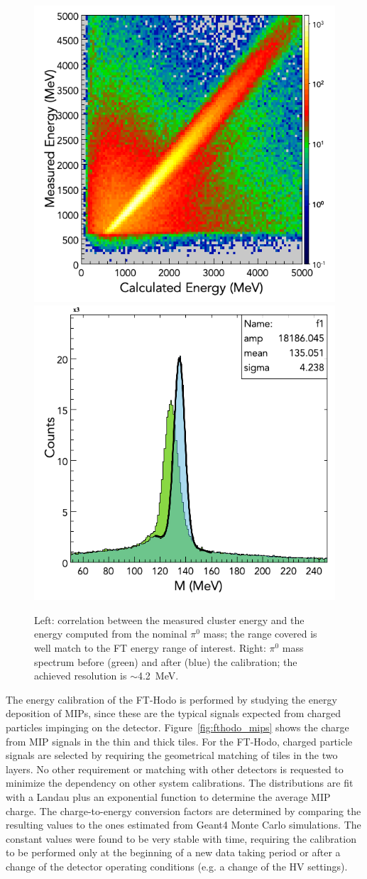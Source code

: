 \begin{figure}
\includegraphics[height=0.48\columnwidth]{fig/ftcal_pi0linearity.png}
\includegraphics[height=0.48\columnwidth]{fig/ftcal_pi0resolution.png}
\caption{Left: correlation between the measured cluster energy and the energy computed from the nominal $\pi^0$
  mass; the range covered is well match to the FT energy range of interest. Right: $\pi^0$ mass spectrum before
  (green) and after (blue) the calibration; the achieved resolution is $\sim$4.2~MeV.}
\label{fig:ftcal_pi0res}
\end{figure}

The energy calibration of the FT-Hodo is performed by studying the energy deposition of MIPs, since these are the
typical signals expected from charged particles impinging on the detector. Figure~\ref{fig:fthodo_mips} shows the
charge from MIP signals in the thin and thick tiles. For the FT-Hodo, charged particle signals are selected by requiring
the geometrical matching of tiles in the two layers. No other requirement or matching with other detectors is requested
to minimize the dependency on other system calibrations. The distributions are fit with a Landau plus an exponential
function to determine the average MIP charge. The charge-to-energy conversion factors are determined by comparing
the resulting values to the ones estimated from Geant4 Monte Carlo simulations. The constant values were found to be
very stable with time, requiring the calibration to be performed only at the beginning of a new data taking period or
after a change of the detector operating conditions (e.g. a change of the HV settings).

